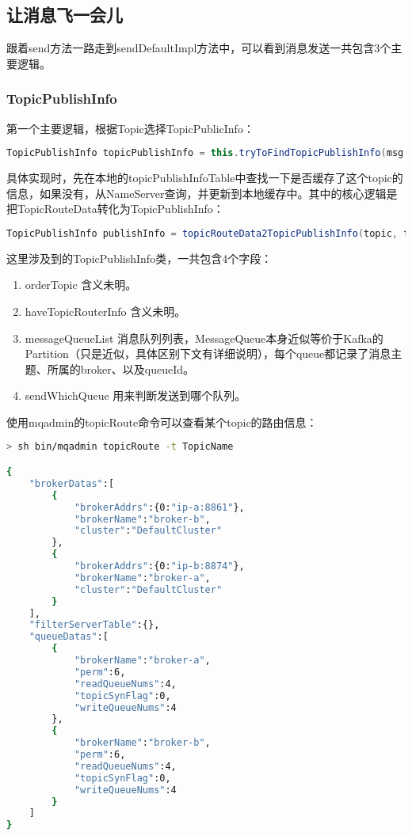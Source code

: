 \subsection{让消息飞一会儿}
跟着send方法一路走到sendDefaultImpl方法中，可以看到消息发送一共包含3个主要逻辑。

\subsubsection{TopicPublishInfo}

第一个主要逻辑，根据Topic选择TopicPublicInfo：
\begin{lstlisting}[language=Java, style=customStyleJavaLight]
TopicPublishInfo topicPublishInfo = this.tryToFindTopicPublishInfo(msg.getTopic());
\end{lstlisting}

具体实现时，先在本地的topicPublishInfoTable中查找一下是否缓存了这个topic的信息，如果没有，从NameServer查询，并更新到本地缓存中。其中的核心逻辑是把TopicRouteData转化为TopicPublishInfo：
\begin{lstlisting}[language=Java, style=customStyleJavaLight]
TopicPublishInfo publishInfo = topicRouteData2TopicPublishInfo(topic, topicRouteData);
\end{lstlisting}

这里涉及到的TopicPublishInfo类，一共包含4个字段：
\begin{enumerate}[itemindent=1em]
\item orderTopic 含义未明。
\item haveTopicRouterInfo 含义未明。
\item messageQueueList 消息队列列表，MessageQueue本身近似等价于Kafka的Partition（只是近似，具体区别下文有详细说明），每个queue都记录了消息主题、所属的broker、以及queueId。
\item sendWhichQueue 用来判断发送到哪个队列。
\end{enumerate}

使用mqadmin的topicRoute命令可以查看某个topic的路由信息：
\begin{lstlisting}[language=sh, style=customStyleBashLight]
> sh bin/mqadmin topicRoute -t TopicName

{
    "brokerDatas":[
        {
            "brokerAddrs":{0:"ip-a:8861"},
            "brokerName":"broker-b",
            "cluster":"DefaultCluster"
        },
        {
            "brokerAddrs":{0:"ip-b:8874"},
            "brokerName":"broker-a",
            "cluster":"DefaultCluster"
        }
    ],
    "filterServerTable":{},
    "queueDatas":[
        {
            "brokerName":"broker-a",
            "perm":6,
            "readQueueNums":4,
            "topicSynFlag":0,
            "writeQueueNums":4
        },
        {
            "brokerName":"broker-b",
            "perm":6,
            "readQueueNums":4,
            "topicSynFlag":0,
            "writeQueueNums":4
        }
    ]
}
\end{lstlisting}

